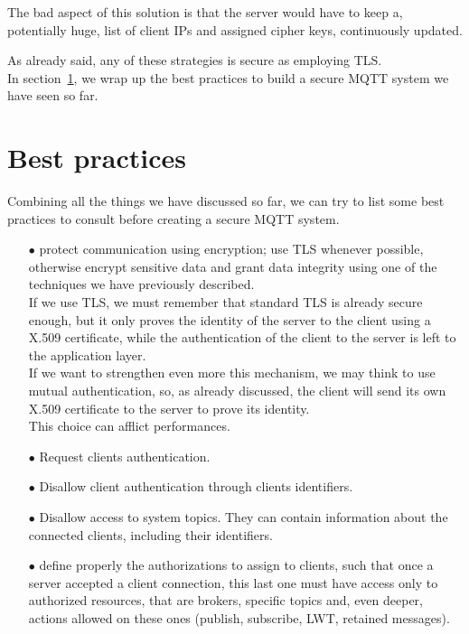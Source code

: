 \documentclass[12pt]{report}
\begin{document}
{{\begin{itemize}
The bad aspect of this solution is that the server would have to keep a, potentially huge, list of client IPs and assigned cipher keys, continuously updated.\\
\end{itemize}

As already said, any of these strategies is secure as employing TLS.\\

In section~\ref{sec:mqttbestpractices}, we wrap up the best practices to build a secure MQTT system we have seen so far.\\

\section{Best practices}
\label{sec:mqttbestpractices}
\bigskip
Combining all the things we have discussed so far, we can try to list some best practices to consult before creating a secure MQTT system.
\bigskip
\begin{itemize}
\setlength{\itemindent}{+4mm}
\item[$\bullet$] protect communication using encryption; use TLS whenever possible, otherwise encrypt sensitive data and grant data integrity using one of the techniques we have previously described.\\
If we use TLS, we must remember that standard TLS is already secure enough, but it only proves the identity of the server to the client using a X.509 certificate, while the authentication of the client to the server is left to the application layer.\\
If we want to strengthen even more this mechanism, we may think to use mutual authentication, so, as already discussed, the client will send its own X.509 certificate to the server to prove its identity.\\
This choice can afflict performances.
\item[$\bullet$] Request clients authentication.%
\item[$\bullet$] Disallow client authentication through clients identifiers.
\item[$\bullet$] Disallow access to system topics. They can contain information about the connected clients, including their identifiers.
\item[$\bullet$] define properly the authorizations to assign to clients, such that once a server accepted a client connection, this last one must have access only to authorized resources, that are brokers, specific topics and, even deeper, actions allowed on these ones (publish, subscribe, LWT, retained messages).

\end{itemize}}}
\end{document}
